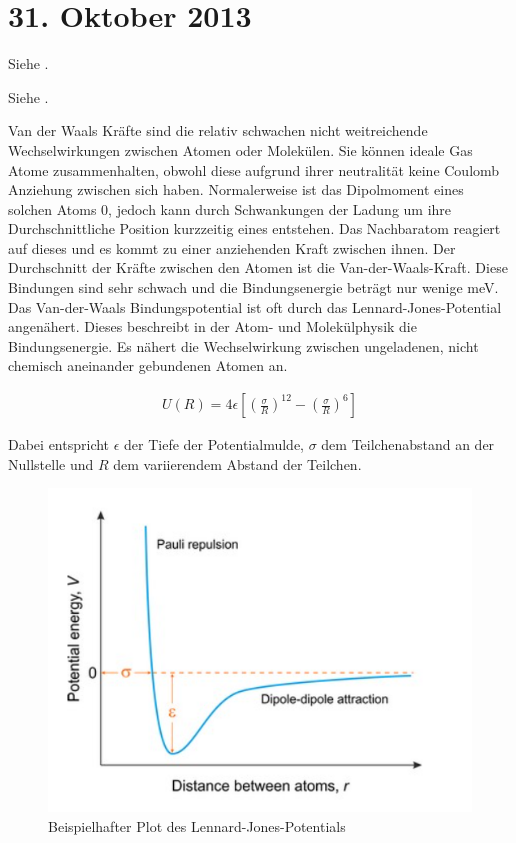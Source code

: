 \section{31. Oktober 2013}

\label{q:70}

Siehe .

\label{q:71}

Siehe .

\label{q:72}

\label{q:73}

Van der Waals Kräfte sind die relativ schwachen nicht weitreichende Wechselwirkungen zwischen Atomen oder Molekülen. Sie können ideale Gas Atome zusammenhalten, obwohl diese aufgrund ihrer neutralität keine Coulomb Anziehung zwischen sich haben.
Normalerweise ist das Dipolmoment eines solchen Atoms 0, jedoch kann durch Schwankungen der Ladung um ihre Durchschnittliche Position kurzzeitig eines entstehen. 
Das Nachbaratom reagiert auf dieses und es kommt zu einer anziehenden Kraft zwischen ihnen. Der Durchschnitt der Kräfte zwischen den Atomen ist die Van-der-Waals-Kraft. Diese Bindungen sind sehr schwach und die Bindungsenergie beträgt nur wenige meV.
Das Van-der-Waals Bindungspotential ist oft durch das Lennard-Jones-Potential angenähert. Dieses beschreibt in der Atom- und Molekülphysik die Bindungsenergie. Es nähert die Wechselwirkung zwischen ungeladenen, nicht chemisch aneinander gebundenen Atomen an.

\begin{align}
    U(R) = 4\epsilon[(\frac{\sigma}{R})^{12} - (\frac{\sigma}{R})^6]
\end{align}

Dabei entspricht $\epsilon$ der Tiefe der Potentialmulde, $\sigma$ dem Teilchenabstand an der Nullstelle und $R$ dem variierendem Abstand der Teilchen.\\

\begin{figure}[H]
    \includegraphics[width=0.8\linewidth]{resources/31-10-2013/lennard.PNG}
    \caption{Beispielhafter Plot des Lennard-Jones-Potentials}
\end{figure}

